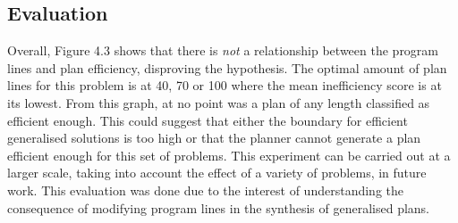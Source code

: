 \subsection{Evaluation}
Overall, Figure 4.3 shows that there is \textit{not} a relationship between the program lines and plan efficiency, disproving the hypothesis. The optimal amount of plan lines for this problem is at 40, 70 or 100 where the mean inefficiency score is at its lowest. From this graph, at no point was a plan of any length classified as efficient enough. This could suggest that either the boundary for efficient generalised solutions is too high or that the planner cannot generate a plan efficient enough for this set of problems. This experiment can be carried out at a larger scale, taking into account the effect of a variety of problems, in future work. This evaluation was done due to the interest of understanding the consequence of modifying program lines in the synthesis of generalised plans.